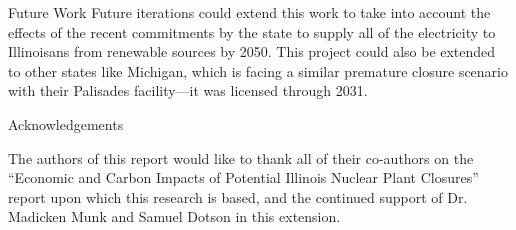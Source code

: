 \documentclass[final]{beamer}
\newlength{\onecolwid}
\newlength{\threecolwid}
\begin{document}
\begin{frame}[t]
\begin{columns}[t,totalwidth=\threecolwid]
\begin{column}{\onecolwid}
\begin{alertblock}{Future Work}
	Future iterations could extend this work to take into account the effects of the recent commitments by the state to supply all of the electricity to Illinoisans from renewable sources by 2050.
	This project could also be extended to other states like Michigan, which is facing a similar premature closure scenario with their Palisades facility---it was licensed through 2031.

\end{alertblock}




\begin{block}{Acknowledgements}

	The authors of this report would like to thank all of their co-authors on the “Economic and Carbon Impacts of Potential Illinois Nuclear Plant Closures” report upon which this research is based, and the continued support of Dr. Madicken Munk and Samuel Dotson in this extension.

\end{block}





\end{column}
\end{columns}
\end{frame}
\end{document}
